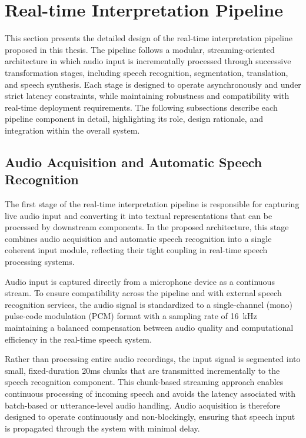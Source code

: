 \section{Real-time Interpretation Pipeline}
\label{sec:pipeline}

This section presents the detailed design of the real-time interpretation pipeline proposed in this thesis. The pipeline follows a modular, streaming-oriented architecture in which audio input is incrementally processed through successive transformation stages, including speech recognition, segmentation, translation, and speech synthesis. Each stage is designed to operate asynchronously and under strict latency constraints, while maintaining robustness and compatibility with real-time deployment requirements. The following subsections describe each pipeline component in detail, highlighting its role, design rationale, and integration within the overall system.
 
\subsection{Audio Acquisition and Automatic Speech Recognition}

The first stage of the real-time interpretation pipeline is responsible for capturing live audio input and converting it into textual representations that can be processed by downstream components. In the proposed architecture, this stage combines audio acquisition and automatic speech recognition into a single coherent input module, reflecting their tight coupling in real-time speech processing systems.

Audio input is captured directly from a microphone device as a continuous stream. To ensure compatibility across the pipeline and with external speech recognition services, the audio signal is standardized to a single-channel (mono) pulse-code modulation (PCM) format with a sampling rate of 16~kHz maintaining a balanced compensation between audio quality and computational efficiency in the real-time speech system.

Rather than processing entire audio recordings, the input signal is segmented into small, fixed-duration 20ms chunks that are transmitted incrementally to the speech recognition component. This chunk-based streaming approach enables continuous processing of incoming speech and avoids the latency associated with batch-based or utterance-level audio handling. Audio acquisition is therefore designed to operate continuously and non-blockingly, ensuring that speech input is propagated through the system with minimal delay.

